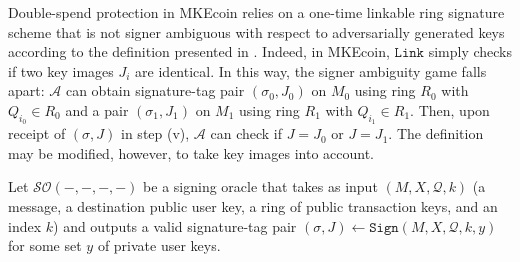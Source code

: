 \documentclass{mrl}
\theoremstyle{definition}
\begin{document}
Double-spend protection in MKEcoin relies on a one-time linkable ring signature scheme that is not signer ambiguous with respect to adversarially generated keys according to the definition presented in \cite{bender2006ring}. Indeed, in MKEcoin, $\texttt{Link}$ simply checks if two key images $J_i$ are identical. In this way, the signer ambiguity game falls apart: $\mathcal{A}$ can obtain signature-tag pair $(\sigma_0, J_0)$ on $M_0$ using ring $R_0$ with $Q_{i_0} \in R_0$ and a pair $(\sigma_1, J_1)$ on $M_1$ using ring $R_1$ with $Q_{i_1} \in R_1$. Then, upon receipt of $(\sigma,J)$ in step (v), $\mathcal{A}$ can check if $J=J_0$ or $J=J_1$. The definition may be modified, however, to take key images into account.


Let $\mathcal{SO}(-,-,-,-)$ be a signing oracle that takes as input $(M,X,\mathcal{Q},k)$ (a message, a destination public user key, a ring of public transaction keys, and an index $k$) and outputs a valid signature-tag pair $(\sigma, J) \leftarrow \texttt{Sign}(M,X,\mathcal{Q},k,y)$ for some set $y$ of private user keys.
\end{document}
